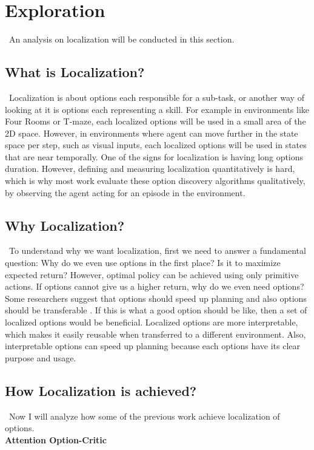 \documentclass{article}
\begin{document}
	\section{Exploration}
	\qquad \ An analysis on localization will be conducted in this section.
	\subsection*{What is Localization?}
	\qquad \ Localization is about options each responsible for a sub-task, or another way of looking at it is options each representing a skill. For example in environments like Four Rooms or T-maze, each localized options will be used in a small area of the 2D space. However, in environments where agent can move further in the state space per step, such as visual inputs, each localized options will be used in states that are near temporally. One of the signs for localization is having long options duration. However, defining and measuring localization quantitatively is hard, which is why most work evaluate these option discovery algorithms qualitatively, by observing the agent acting for an episode in the environment.
	\subsection*{Why Localization?}
	\qquad \ To understand why we want localization, first we need to answer a fundamental question: Why do we even use options in the first place? Is it to maximize expected return? However, optimal policy can be achieved using only primitive actions. If options cannot give us a higher return, why do we even need options? Some researchers suggest that options should speed up planning \cite{harb2017waiting} \cite{harutyunyan2019termination} and also options should be transferable \cite{khetarpal2020options} \cite{attentionoptioncritic}. If this is what a good option should be like, then a set of localized options would be beneficial. Localized options are more interpretable, which makes it easily reusable when transferred to a different environment. Also, interpretable options can speed up planning because each options have its clear purpose and usage.
	\subsection*{How Localization is achieved?}
	\qquad \ Now I will analyze how some of the previous work achieve localization of options.\vspace{0.15in}\\
	\large{\bfseries{Attention Option-Critic}}\vspace{0.05in}
	
\end{document}
